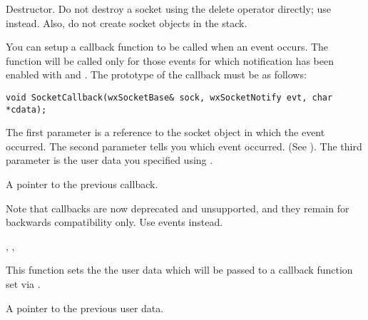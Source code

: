 
Destructor. Do not destroy a socket using the delete operator directly;
use  instead. Also, do not create
socket objects in the stack.

%
%
\label{wxsocketbasecallback}


You can setup a callback function to be called when an event occurs.
The function will be called only for those events for which notification
has been enabled with  and 
. The prototype of the
callback must be as follows:

\begin{verbatim}
void SocketCallback(wxSocketBase& sock, wxSocketNotify evt, char *cdata);
\end{verbatim}

The first parameter is a reference to the socket object in which the
event occurred. The second parameter tells you which event occurred.
(See ). The third parameter
is the user data you specified using .


A pointer to the previous callback.


Note that callbacks are now deprecated and unsupported, and they remain
for backwards compatibility only. Use events instead.


, 
, 

%
%
\label{wxsocketbasecallbackdata}


This function sets the the user data which will be passed to a
callback function set via .


A pointer to the previous user data.

